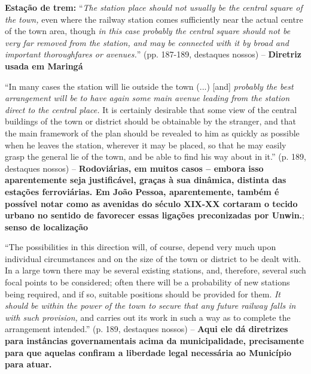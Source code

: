 \documentclass[12pt, a4paper]{book} %
\begin{document}
        \textbf{Estação de trem:} ``\textit{The station place should not usually be the central square of the town,} even where the railway station comes sufficiently near the actual centre of the town area, though \textit{in this case probably the central square should not be very far removed from the station, and may be connected with it by broad and important thoroughfares or avenues.}'' (pp. 187-189, destaques nossos) – \textbf{Diretriz usada em Maringá}

        ``In many cases the station will lie outside the town (...) [and] \textit{probably the best arrangement will be to have again some main avenue leading from the station direct to the central place.} It is certainly desirable that some view of the central buildings of the town or district should be obtainable by the stranger, and that the main framework of the plan should be revealed to him as quickly as possible when he leaves the station, wherever it may be placed, so that he may easily grasp the general lie of the town, and be able to find his way about in it.'' (p. 189, destaques nossos) – \textbf{Rodoviárias, em muitos casos – embora isso aparentemente seja justificável, graças à sua dinâmica, distinta das estações ferroviárias.
        Em João Pessoa, aparentemente, também é possível notar como as avenidas do século XIX-XX cortaram o tecido urbano no sentido de favorecer essas ligações preconizadas por Unwin.}; \textbf{senso de localização}

        ``The possibilities in this direction will, of course, depend very much upon individual circumstances and on the size of the town or district to be dealt with. In a large town there may be several existing stations, and, therefore, several such focal points to be considered; often there will be a probability of new stations being required, and if so, suitable positions should be provided for them. \textit{It should be within the power of the town to secure that any future railway falls in with such provision,} and carries out its work in such a way as to complete the arrangement intended.'' (p. 189, destaques nossos) – \textbf{Aqui ele dá diretrizes para instâncias governamentais acima da municipalidade, precisamente para que aquelas confiram a liberdade legal necessária ao Município para atuar.}
\end{document}
